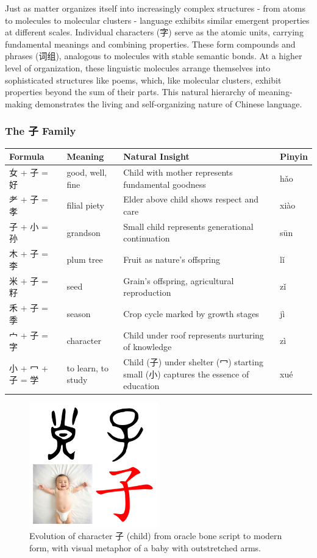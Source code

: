 \documentclass[11pt,letterpaper]{article}
\begin{document}
Just as matter organizes itself into increasingly complex structures -
from atoms to molecules to molecular clusters - language exhibits
similar emergent properties at different scales. Individual characters
(字) serve as the atomic units, carrying fundamental meanings and
combining properties. These form compounds and phrases (词组), analogous
to molecules with stable semantic bonds. At a higher level of
organization, these linguistic molecules arrange themselves into
sophisticated structures like poems, which, like molecular clusters,
exhibit properties beyond the sum of their parts. This natural hierarchy
of meaning-making demonstrates the living and self-organizing nature of
Chinese language.

\subsubsection{The 子 Family}\label{the-ux5b50-family}

\begin{longtable}{|p{3cm}|p{3cm}|p{6cm}|p{2cm}|}
\hline
\textbf{Formula} & \textbf{Meaning} & \textbf{Natural Insight} & \textbf{Pinyin} \\
\hline
女 + 子 = 好 & good, well, fine & Child with mother represents fundamental goodness & hǎo \\
\hline
耂 + 子 = 孝 & filial piety & Elder above child shows respect and care & xiào \\
\hline
子 + 小 = 孙 & grandson & Small child represents generational continuation & sūn \\
\hline
木 + 子 = 李 & plum tree & Fruit as nature's offspring & lǐ \\
\hline
米 + 子 = 籽 & seed & Grain's offspring, agricultural reproduction & zǐ \\
\hline
禾 + 子 = 季 & season & Crop cycle marked by growth stages & jì \\
\hline
宀 + 子 = 字 & character & Child under roof represents nurturing of knowledge & zì \\
\hline
小 + 冖 + 子 = 学 & to learn, to study & Child (子) under shelter (冖) starting small (小) captures the essence of education & xué \\
\hline
\end{longtable}

\begin{figure}
\centering
\includegraphics[width=0.5\textwidth]{./images/zi_child.png}
\caption{Evolution of character 子 (child) from oracle bone script to
modern form, with visual metaphor of a baby with outstretched arms.}
\end{figure}
\end{document}
